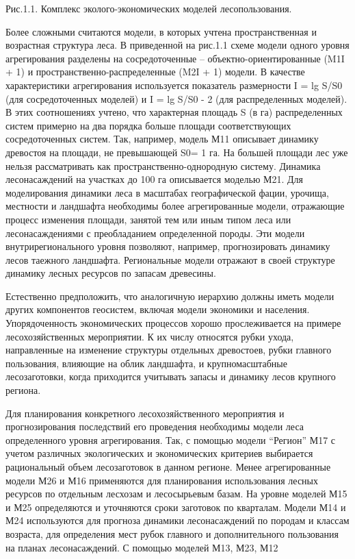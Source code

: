 \documentclass{report}
\begin{document}
Рис.1.1. Комплекс эколого-экономических моделей лесопользования.

Более сложными считаются модели, в которых учтена простран\-ственная и возрастная структура леса. В приведенной на
рис.1.1 схеме модели одного уровня агрегирования разделены на сосредоточен\-ные – объектно-ориентированные (M1I + 1) и
пространственно-распределенные (M2I + 1) модели. В качестве характеристики агрегирования используется показатель
размер\-ности I = lg S/S0 (для сосредоточенных моделей) и I = lg S/S0 - 2 (для распределенных моделей). В этих
соотношениях учтено, что характерная площадь S (в га) распределенных систем примерно на два порядка больше площади
соответствующих сосредоточен\-ных систем. Так, например, модель М11 описывает динамику дре\-востоя на площади, не
превышающей S0= 1 га. На большей площади лес уже нельзя рассматривать как пространственно-однородную систему. Динамика
лесонасаждений на участках до 100 га описы\-вается моделью М21. Для моделирования динамики леса в масшта\-бах
географической фации, урочища, местности и ландшафта не\-обходимы более агрегированные модели, отражающие процесс
из\-менения площади, занятой тем или иным типом леса или лесо\-насаждениями с преобладанием определенной породы. Эти
модели внутрирегионального уровня позволяют, например, прогнозировать ди\-намику лесов таежного ландшафта. Региональные
модели отражают в своей структуре динамику лес\-ных ресурсов по запасам древесины.

Естественно предположить, что аналогичную иерархию долж\-ны иметь модели других компонентов геосистем, включая модели
экономики и населения. Упорядоченность экономических процессов хорошо прослеживается на примере лесохозяйственных
мероприятии. К их числу относятся рубки ухода, направленные на изменение структуры отдельных древостоев, рубки главного
пользования, влияющие на облик ландшафта, и крупномасштаб\-ные лесозаготовки, когда приходится учитывать запасы и
динами\-ку лесов крупного региона.

Для планирования конкретного лесохозяйственного меропри\-ятия и прогнозирования последствий его проведения необходимы
модели леса определенного уровня агрегирования. Так, с помощью модели “Регион” М17 с учетом различных экологических и
эконо\-мических критериев выбирается рациональный объем лесозагото\-вок в данном регионе. Менее агрегированные модели
М26 и М16 применяются для планирования использования лесных ресурсов по отдельным лесхозам и лесосырьевым базам. На
уровне моделей М15 и М25 определяются и уточняются сроки заготовок по квар\-талам. Модели М14 и М24 используются для
прогноза динамики лесонасаждений по породам и классам возраста, для определения мест рубок главного и дополнительного
пользования на планах лесонасаждений. С помощью моделей М13, М23, М12 
\end{document}
